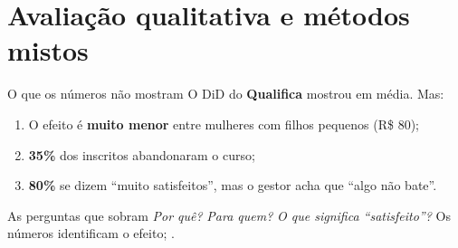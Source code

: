 \section[Qualitativo]{Avaliação qualitativa e métodos mistos}

\begin{frame}{O que os números não mostram}
  O DiD do \textbf{Qualifica} mostrou  em média. Mas:
  \vspace{0.2cm}
  \begin{enumerate}
    \item O efeito é \textbf{muito menor} entre mulheres com filhos pequenos (R\$ 80);
    \item \textbf{35\%} dos inscritos abandonaram o curso;
    \item \textbf{80\%} se dizem ``muito satisfeitos'', mas o gestor acha que ``algo não bate''.
  \end{enumerate}
  \vspace{0.3cm}
  \begin{block}{As perguntas que sobram}
    \small \emph{Por quê?} \emph{Para quem?} \emph{O que significa ``satisfeito''?} Os números identificam o efeito; .
  \end{block}
\end{frame}

